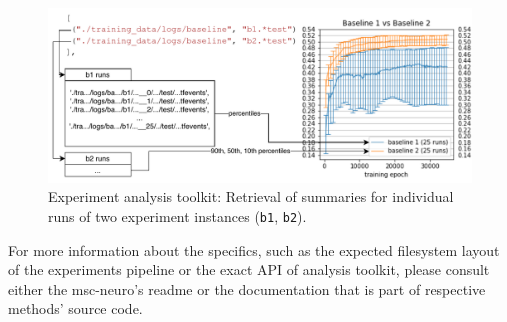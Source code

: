 \begin{figure}[ht]
    \centering
    \includegraphics[width=1\textwidth]{../figures/03_msc-neuro_2}
    \caption[Experiment analysis toolkit]{Experiment analysis toolkit: Retrieval of summaries for individual runs of two experiment instances (\texttt{b1}, \texttt{b2}).}
    \label{fig:3.4}
\end{figure}

For more information about the specifics, such as the expected filesystem layout of the experiments pipeline or the exact API of analysis toolkit, please consult either the msc-neuro’s readme or the documentation that is part of respective methods’ source code. 
